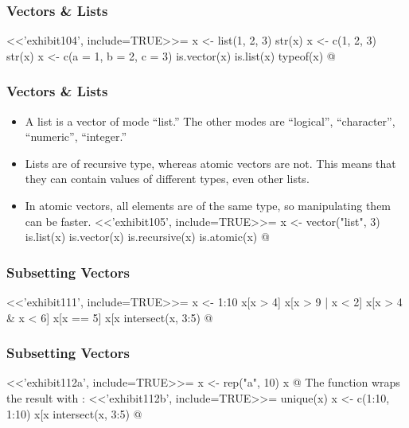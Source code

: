 \begin{frame}[fragile]%
\frametitle{Vectors \& Lists}
<<'exhibit104', include=TRUE>>=
  x <- list(1, 2, 3)
  str(x)
  x <- c(1, 2, 3)
  str(x)
  x <- c(a = 1, b = 2, c = 3)
  is.vector(x)
  is.list(x)
  typeof(x)
@
\end{frame}


\begin{frame}[fragile]%
\frametitle{Vectors \& Lists}
\begin{itemize}
\item A list is a vector of mode ``list.'' The other modes are ``logical'', ``character'', ``numeric'', ``integer.'' 
\item Lists are of recursive type, whereas atomic vectors are not. This means that they can contain values of different types, even other lists. 
\item In atomic vectors, all elements are of the same type, so manipulating them can be faster.
<<'exhibit105', include=TRUE>>=
  x <- vector("list", 3)
  is.list(x)
  is.vector(x)
  is.recursive(x)
  is.atomic(x) 
@
\end{itemize}
\end{frame}


\begin{frame}[fragile]%
\frametitle{Subsetting Vectors}
<<'exhibit111', include=TRUE>>=
  x <- 1:10
  x[x > 4]
  x[x > 9 | x < 2]
  x[x > 4 & x < 6]  
  x[x == 5]
  x[x %
  intersect(x, 3:5)
@
\end{frame}


\begin{frame}[fragile]%
\frametitle{Subsetting Vectors}
<<'exhibit112a', include=TRUE>>=
  x <- rep("a", 10)
  x
@
The function  wraps the result with :
<<'exhibit112b', include=TRUE>>=
  unique(x)
  x <- c(1:10, 1:10)
  x[x %
  intersect(x, 3:5)
@
\end{frame}


